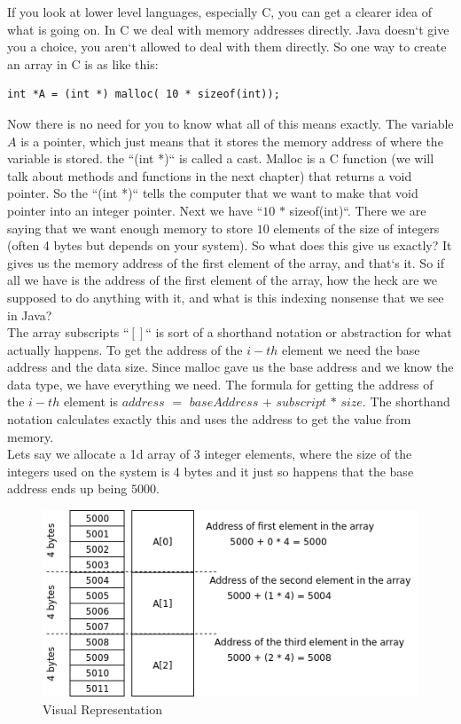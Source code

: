 \documentclass[11]{article}
\begin{document}
If you look at lower level languages, especially C, you can get a clearer idea of what is going on. In C we deal with memory addresses directly. Java doesn`t give you a choice, you aren`t allowed to deal with them directly. So one way to create an array in C is as like this:

\begin{lstlisting}
int *A = (int *) malloc( 10 * sizeof(int));
\end{lstlisting}

Now there is no need for you to know what all of this means exactly. The variable $A$ is a pointer, which just means that it stores the memory address of where the variable is stored. the ``(int *)`` is called a cast. Malloc is a C function (we will talk about methods and functions in the next chapter) that returns a void pointer. So the ``(int *)`` tells the computer that we want to make that void pointer into an integer pointer. Next we have ``$10$ $*$ sizeof(int)``. There we are saying that we want  enough memory to store $10$ elements of the size of integers (often 4 bytes but depends on your system). So what does this give us exactly? It gives us the memory address of the first element of the array, and that`s it. So if all we have is the address of the first element of the array, how the heck are we supposed to do anything with it, and what is this indexing nonsense that we see in Java?\\

The array subscripts ``$[ ]$`` is sort of a shorthand notation or abstraction for what actually happens. To get the address of the $i-th$ element we need the base address and the data size. Since malloc gave us the base address and we know the data type, we have everything we need. The formula for getting the address of the $i-th$ element is $address$ $=$ $baseAddress$ $+$  $subscript$ $*$ $size$. The shorthand notation calculates exactly this and uses the address to get the value from memory.\\

Lets say we allocate a 1d array of 3 integer elements, where the size of the integers used on the system is 4 bytes and it just so happens that the base address ends up being $5000$.


\begin{figure}[H]
	\centering
	\includegraphics[scale=0.75]{rawarrays.png}
	\caption{Visual Representation}
\end{figure}
\end{document}

